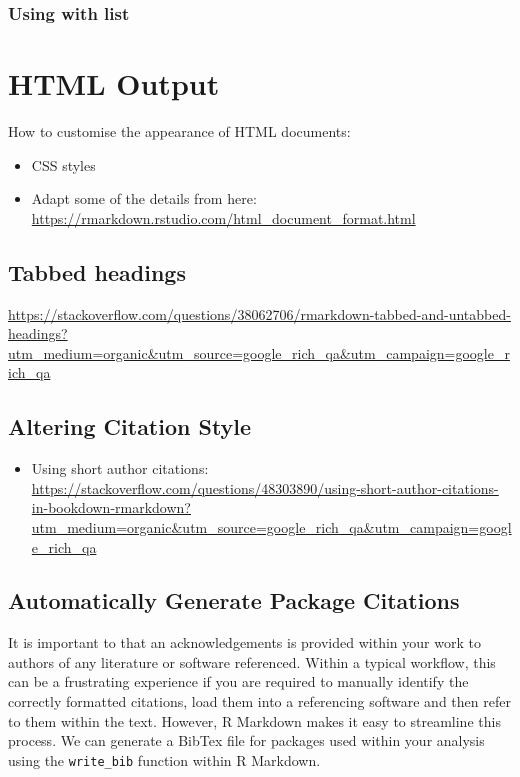 \documentclass[]{book}
\providecommand{\tightlist}{%
  \setlength{\itemsep}{0pt}\setlength{\parskip}{0pt}}
\begin{document}
\subsection{Using with list}\label{using-with-list}

\chapter{HTML Output}\label{html-output}

How to customise the appearance of HTML documents:

\begin{itemize}
\tightlist
\item
  CSS styles
\item
  Adapt some of the details from here:
  \url{https://rmarkdown.rstudio.com/html_document_format.html}
\end{itemize}

\section{Tabbed headings}\label{tabbed-headings}

\url{https://stackoverflow.com/questions/38062706/rmarkdown-tabbed-and-untabbed-headings?utm_medium=organic\&utm_source=google_rich_qa\&utm_campaign=google_rich_qa}

\section{Altering Citation Style}\label{altering-citation-style}

\begin{itemize}
\tightlist
\item
  Using short author citations:
  \url{https://stackoverflow.com/questions/48303890/using-short-author-citations-in-bookdown-rmarkdown?utm_medium=organic\&utm_source=google_rich_qa\&utm_campaign=google_rich_qa}
\end{itemize}

\section{Automatically Generate Package
Citations}\label{automatically-generate-package-citations}

It is important to that an acknowledgements is provided within your work
to authors of any literature or software referenced. Within a typical
workflow, this can be a frustrating experience if you are required to
manually identify the correctly formatted citations, load them into a
referencing software and then refer to them within the text. However, R
Markdown makes it easy to streamline this process. We can generate a
BibTex file for packages used within your analysis using the
\texttt{write\_bib} function within R Markdown.
\end{document}
